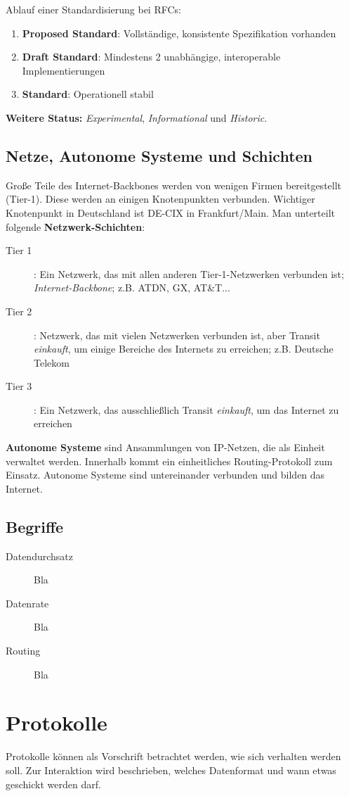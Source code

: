 \documentclass{article} %
\begin{document}
Ablauf einer Standardisierung bei RFCs:
\begin{enumerate}
	\item \textbf{Proposed Standard}: Vollständige, konsistente Spezifikation vorhanden
	\item \textbf{Draft Standard}: Mindestens 2 unabhängige, interoperable Implementierungen
	\item \textbf{Standard}: Operationell stabil
\end{enumerate}
\textbf{Weitere Status:} \emph{Experimental}, \emph{Informational} und \emph{Historic}.
\subsection{Netze, Autonome Systeme und Schichten}
Große Teile des Internet-Backbones werden von wenigen Firmen bereitgestellt (Tier-1).
Diese werden an einigen Knotenpunkten verbunden.
Wichtiger Knotenpunkt in Deutschland ist DE-CIX in Frankfurt/Main.
Man unterteilt folgende \textbf{Netzwerk-Schichten}:
\begin{description}
	\item[Tier 1]: Ein Netzwerk, das mit allen anderen Tier-1-Netzwerken verbunden ist; \emph{Internet-Backbone}; z.B. ATDN, GX, AT\&T...
	\item[Tier 2]: Netzwerk, das mit vielen Netzwerken verbunden ist, aber Transit \emph{einkauft}, um einige Bereiche des Internets zu erreichen; z.B. Deutsche Telekom
	\item[Tier 3]: Ein Netzwerk, das ausschließlich Transit \emph{einkauft}, um das
	Internet zu erreichen
\end{description}
\textbf{Autonome Systeme} sind Ansammlungen von IP-Netzen, die als Einheit verwaltet werden.
Innerhalb kommt ein einheitliches Routing-Protokoll zum Einsatz.
Autonome Systeme sind untereinander verbunden und
bilden das Internet.

\subsection{Begriffe}
\begin{description}
	\item[Datendurchsatz] Bla
	\item[Datenrate] Bla
	\item[Routing] Bla
\end{description}

\section{Protokolle}
Protokolle können als Vorschrift betrachtet werden, wie sich verhalten werden soll. Zur Interaktion wird beschrieben, welches Datenformat und wann etwas geschickt werden darf.
\end{document}
